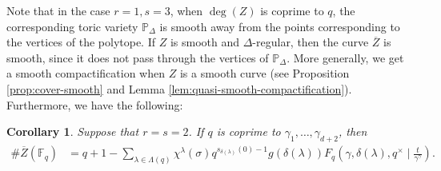 \documentclass[11pt, reqno]{amsart}
\theoremstyle{plain}
\newtheorem{corol}[theo]{Corollary}
\theoremstyle{definition}
\newcommand{\Ps}{\mathbb{P}}
\newcommand{\F}{\mathbb{F}}
\newcommand{\ga}{\gamma}
\begin{document}
Note that in the case $r=1,s=3$, when $\deg(Z)$ is coprime to $q$, the corresponding toric variety $\Ps_{\Delta}$ is smooth away from the points corresponding to the vertices of the polytope. If $Z$ is smooth and $\Delta$-regular, then the curve $\overline{Z}$ is smooth, since it does not pass through the vertices of $\Ps_\Delta$. More generally, we get a smooth compactification when $Z$ is a smooth curve (see Proposition \ref{prop:cover-smooth} and Lemma \ref{lem:quasi-smooth-compactification}). Furthermore, we have the following:
\begin{corol} \label{cor:curves-hgm}
Suppose that $r=s=2$.
If $q$ is coprime to $\ga_1,\dots,\ga_{d+2}$, then 
\begin{align*}
      \#\overline{Z}(\F_q)&= q+1 -\sum_{\lambda \in \Lambda(q)} \chi^{\lambda}(\sigma) q^{s_{\delta(\lambda)}(0)-1} g(\delta(\lambda))  F_q\left(\gamma,\delta(\lambda),q^\times \mid \frac{t}{\gamma^\gamma}\right).
  \end{align*}
\end{corol}
\end{document}
